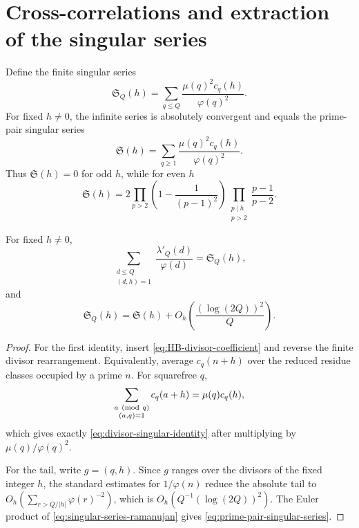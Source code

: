 \section{Cross-correlations and extraction of the singular series}
\label{sec:ramanujan-correlations}

Define the finite singular series
\begin{equation}
 \mathfrak S_Q(h)=
 \sum_{q\leq Q}\frac{\mu(q)^2c_q(h)}{\varphi(q)^2}.
 \label{eq:finite-singular-series}
\end{equation}
For fixed $h\ne0$, the infinite series is absolutely convergent and equals
the prime-pair singular series
\begin{equation}
 \mathfrak S(h)=
 \sum_{q\geq1}\frac{\mu(q)^2c_q(h)}{\varphi(q)^2}.
 \label{eq:singular-series-ramanujan}
\end{equation}
Thus $\mathfrak S(h)=0$ for odd $h$, while for even $h$
\begin{equation}
 \mathfrak S(h)=
 2\prod_{p>2}\left(1-\frac1{(p-1)^2}\right)
 \prod_{\substack{p\mid h\\p>2}}\frac{p-1}{p-2}.
 \label{eq:prime-pair-singular-series}
\end{equation}

\begin{lemma}
\label{lem:finite-singular-calibration}
For fixed $h\ne0$,
\begin{equation}
 \sum_{\substack{d\leq Q\\(d,h)=1}}
 \frac{\lambda'_Q(d)}{\varphi(d)}
 =\mathfrak S_Q(h),
 \label{eq:divisor-singular-identity}
\end{equation}
and
\begin{equation}
 \mathfrak S_Q(h)=\mathfrak S(h)
 +O_h\left(\frac{(\log(2Q))^2}{Q}\right).
 \label{eq:finite-singular-tail}
\end{equation}
\end{lemma}

\begin{proof}
For the first identity, insert \eqref{eq:HB-divisor-coefficient} and
reverse the finite divisor rearrangement.  Equivalently, average
$c_q(n+h)$ over the reduced residue classes occupied by a prime $n$.  For
squarefree $q$,
\begin{equation}
 \sum_{\substack{a\ ({\rm mod}\ q)\\(a,q)=1}}c_q(a+h)
 =\mu(q)c_q(h),
 \label{eq:reduced-residue-ramanujan-average}
\end{equation}
which gives exactly \eqref{eq:divisor-singular-identity} after multiplying
by $\mu(q)/\varphi(q)^2$.

For the tail, write $g=(q,h)$.  Since $g$ ranges over the divisors of the
fixed integer $h$, the standard estimates for $1/\varphi(n)$ reduce the
absolute tail to
$O_h(\sum_{r>Q/|h|}\varphi(r)^{-2})$, which is
$O_h(Q^{-1}(\log(2Q))^2)$.  The Euler product of
\eqref{eq:singular-series-ramanujan} gives
\eqref{eq:prime-pair-singular-series}.
\end{proof}

